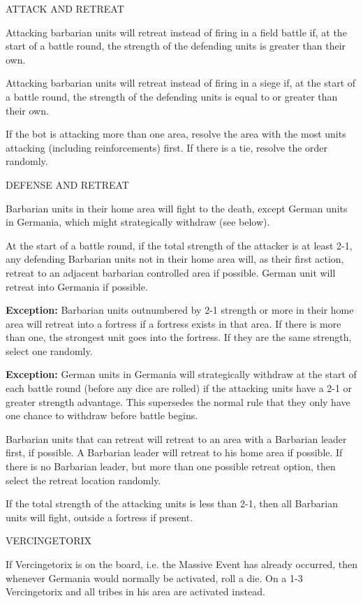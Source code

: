 \label{solitaire:attack_and_retreat}ATTACK AND RETREAT

Attacking barbarian units will retreat instead of firing in a field battle if, at the start of a battle round, the strength of the defending units is greater than their own.

Attacking barbarian units will retreat instead of firing in a siege if, at the start of a battle round, the strength of the defending units is equal to or greater than their own.

If the bot is attacking more than one area, resolve the area with the most units attacking (including reinforcements) first. If there is a tie, resolve the order randomly.

\label{solitaire:defense_and_retreat}DEFENSE AND RETREAT

Barbarian units in their home area will fight to the death, except German units in Germania, which might strategically withdraw (see below).

At the start of a battle round, if the total strength of the attacker is at least 2-1, any defending Barbarian units not in their home area will, as their first action, retreat to an adjacent barbarian controlled area if possible. German unit will retreat into Germania if possible.

\textbf{Exception:} Barbarian units outnumbered by 2-1 strength or more in their home area will retreat into a fortress if a fortress exists in that area. If there is more than one, the strongest unit goes into the fortress. If they are the same strength, select one randomly.

\textbf{Exception:} German units in Germania will strategically withdraw at the start of each battle round (before any dice are rolled) if the attacking units have a 2-1 or greater strength advantage. This supersedes the normal rule that they only have one chance to withdraw before battle begins.

Barbarian units that can retreat will retreat to an area with a Barbarian leader first, if possible. A Barbarian leader will retreat to his home area if possible. If there is no Barbarian leader, but more than one possible retreat option, then select the retreat location randomly.

If the total strength of the attacking units is less than 2-1, then all Barbarian units will fight, outside a fortress if present.

\newpage
\label{solitaire:vercingetorix}VERCINGETORIX

If Vercingetorix is on the board, i.e. the Massive Event has already occurred, then whenever Germania would normally be activated, roll a die. On a 1-3 Vercingetorix and all tribes in his area are activated instead.

